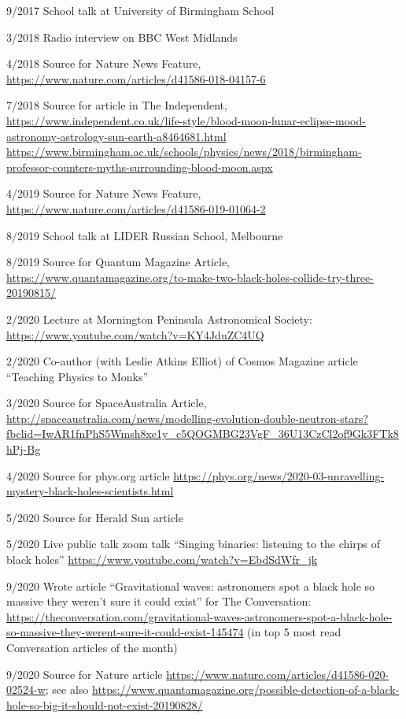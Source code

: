 \documentclass[margin,line]{res}
\begin{document}
\begin{resume}
9/2017	School talk at University of Birmingham School

3/2018	Radio interview on BBC West Midlands

4/2018	Source for Nature News Feature, \url{https://www.nature.com/articles/d41586-018-04157-6}

7/2018 	Source for article in The Independent, \url{https://www.independent.co.uk/life-style/blood-moon-lunar-eclipse-mood-astronomy-astrology-sun-earth-a8464681.html}\\
\url{https://www.birmingham.ac.uk/schools/physics/news/2018/birmingham-professor-counters-myths-surrounding-blood-moon.aspx}

4/2019	Source for Nature News Feature, \url{https://www.nature.com/articles/d41586-019-01064-2}

8/2019	School talk at LIDER Russian School, Melbourne

8/2019 	Source for Quantum Magazine Article, \url{https://www.quantamagazine.org/to-make-two-black-holes-collide-try-three-20190815/}

2/2020	Lecture at Mornington Peninsula Astronomical Society: \url{https://www.youtube.com/watch?v=KY4JduZC4UQ}

2/2020	Co-author (with Leslie Atkins Elliot) of Cosmos Magazine article ``Teaching Physics to Monks''
	
3/2020 	Source for SpaceAustralia Article, \url{http://spaceaustralia.com/news/modelling-evolution-double-neutron-stars?fbclid=IwAR1fnPhS5Wmsh8xe1y_c5QOGMBG23VgF_36U13CzCl2of9Gk3FTk8hPj-Bg}
	  
4/2020	Source for phys.org article \url{https://phys.org/news/2020-03-unravelling-mystery-black-holes-scientists.html}

5/2020	Source for Herald Sun article

5/2020	Live public talk zoom talk ``Singing binaries: listening to the chirps of black holes'' \url{https://www.youtube.com/watch?v=EbdSdWfr_jk}

9/2020	Wrote article ``Gravitational waves: astronomers spot a black hole so massive they weren't sure it could exist'' for The Conversation: \url{https://theconversation.com/gravitational-waves-astronomers-spot-a-black-hole-so-massive-they-werent-sure-it-could-exist-145474} (in top 5 most read Conversation articles of the month)

9/2020	Source for Nature article \url{https://www.nature.com/articles/d41586-020-02524-w}; see also \url{https://www.quantamagazine.org/possible-detection-of-a-black-hole-so-big-it-should-not-exist-20190828/}


\end{resume}
\end{document}
